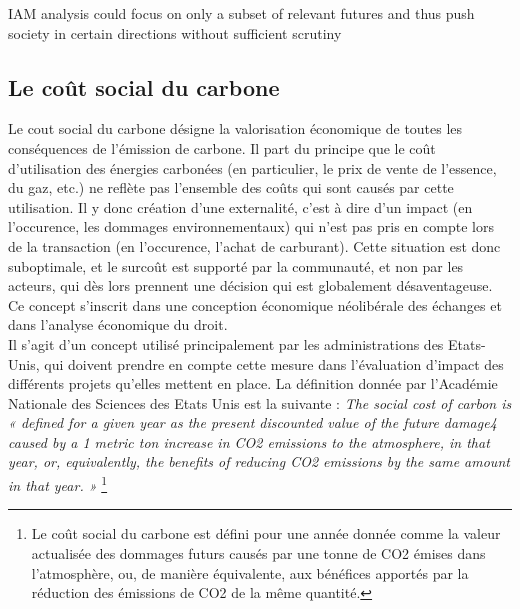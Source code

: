 \begin{authoredquote}
    IAM analysis could focus on only a subset of relevant futures and thus push society in certain directions without sufficient scrutiny
\end{authoredquote}





\subsection{Le coût social du carbone}
\label{sect:1.3.2}

Le {cout social du carbone} désigne la valorisation économique de toutes les conséquences de l'émission de carbone. Il part du principe que le coût d'utilisation des énergies carbonées (en particulier, le prix de vente de l'essence, du gaz, etc.) ne reflète pas l'ensemble des coûts qui sont causés par cette utilisation. Il y donc création d'une externalité, c'est à dire d'un impact (en l'occurence, les dommages environnementaux) qui n'est pas pris en compte lors de la transaction (en l'occurence, l'achat de carburant). Cette situation est donc suboptimale, et le surcoût est supporté par la communauté, et non par les acteurs, qui dès lors prennent une décision qui est globalement désaventageuse. Ce concept s'inscrit dans une conception économique néolibérale des échanges et dans l'analyse économique du droit.  \\

Il s'agit d'un concept utilisé principalement par les administrations des Etats-Unis, qui doivent prendre en compte cette mesure dans l'évaluation d'impact des différents projets qu'elles mettent en place. La définition donnée par l'Académie Nationale des Sciences des Etats Unis est la suivante : \emph{The social cost of carbon is « defined for a given year as the present discounted value of the future damage4 caused by a 1 metric ton increase in CO2 emissions to the atmosphere, in that year, or, equivalently, the benefits of reducing CO2 emissions by the same amount in that year. » }\footnote{Le coût social du carbone est défini pour une année donnée comme la valeur actualisée des dommages futurs causés par une tonne de CO2 émises dans l'atmosphère, ou, de manière équivalente, aux bénéfices apportés par la réduction des émissions de CO2 de la même quantité.} \\

